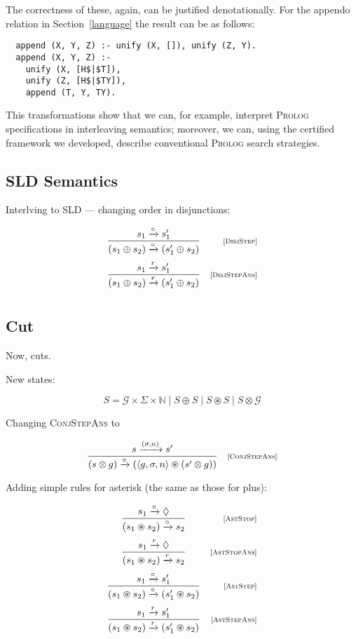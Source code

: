The correctness of these, again, can be justified denotationally. For the appendo relation in Section~\ref{language} the result
can be as follows:

\begin{lstlisting}
  append (X, Y, Z) :- unify (X, []), unify (Z, Y).
  append (X, Y, Z) :-
    unify (X, [H$|$T]),
    unify (Z, [H$|$TY]),
    append (T, Y, TY).
\end{lstlisting}

This transformations show that we can, for example, interpret \textsc{Prolog} specifications in interleaving semantics; moreover, we can,
using the certified framework we developed, describe conventional \textsc{Prolog} search strategies.

\subsection{SLD Semantics}

Interlving to SLD --- changing order in disjunctions:

\[
  \begin{array}{cr}
    \dfrac{s_1 \xrightarrow{\circ} s'_1}{(s_1 \oplus s_2) \xrightarrow{\circ} (s'_1 \oplus s_2)} &\mbox{\scriptsize{[\textsc{DisjStep}]}}\\[5mm]
    \dfrac{s_1 \xrightarrow{r} s'_1}{(s_1 \oplus s_2) \xrightarrow{r} (s'_1 \oplus s_2)} &\mbox{\scriptsize{[\textsc{DisjStepAns}]}}\\[5mm]
  \end{array}
\]

\subsection{Cut}

Now, cuts.

New states:

\[
S = \mathcal{G}\times\Sigma\times\mathbb{N}\mid S\oplus S \mid  S \circledast S \mid S \otimes \mathcal{G}
\]


Changing \textsc{ConjStepAns} to

  \[
  \begin{array}{cr}
    \dfrac{s \xrightarrow{(\sigma, n)} s'}{(s \otimes g) \xrightarrow{\circ} (\left<{g, \sigma, n}\right> \circledast (s' \otimes g))} & \mbox{\scriptsize{[\textsc{ConjStepAns}]}} 
  \end{array}
  \]
  
Adding simple rules for asterisk (the same as those for plus):

  \[
  \begin{array}{cr}
    \dfrac{s_1 \xrightarrow{\circ} \Diamond}{(s_1 \circledast s_2) \xrightarrow{\circ} s_2} & \mbox{\scriptsize{[\textsc{AstStop}]}}\\[5mm]
    \dfrac{s_1 \xrightarrow{r} \Diamond}{(s_1 \circledast s_2) \xrightarrow{r} s_2} & \mbox{\scriptsize{[\textsc{AstStopAns}]}}\\[5mm]
    \dfrac{s_1 \xrightarrow{\circ} s'_1}{(s_1 \circledast s_2) \xrightarrow{\circ} (s'_1 \circledast s_2)} &\mbox{\scriptsize{[\textsc{AstStep}]}}\\[5mm]
    \dfrac{s_1 \xrightarrow{r} s'_1}{(s_1 \circledast s_2) \xrightarrow{r} (s'_1 \circledast s_2)} &\mbox{\scriptsize{[\textsc{AstStepAns}]}}\\[5mm]
  \end{array}
\]
  
